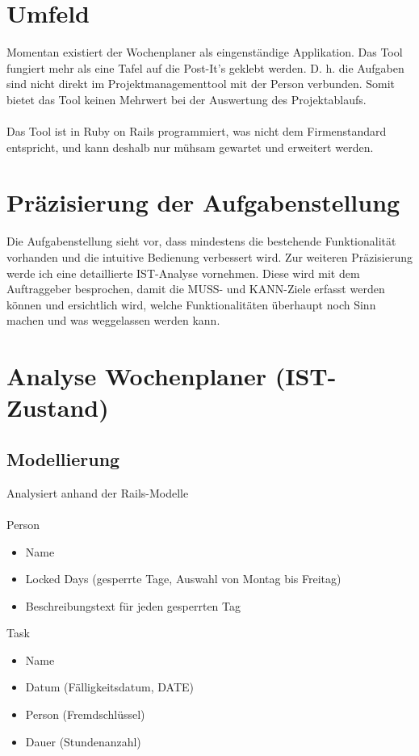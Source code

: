 \section{Umfeld}
Momentan existiert der Wochenplaner als eingenständige Applikation.
Das Tool fungiert mehr als eine Tafel auf die Post-It's geklebt werden. D. h. die Aufgaben sind nicht direkt im Projektmanagementtool mit der Person verbunden.
Somit bietet das Tool keinen Mehrwert bei der Auswertung des Projektablaufs.\\
\\
Das Tool ist in Ruby on Rails programmiert, was nicht dem Firmenstandard entspricht, und kann deshalb nur mühsam gewartet und erweitert werden.

\section{Präzisierung der Aufgabenstellung}
Die Aufgabenstellung sieht vor, dass mindestens die bestehende Funktionalität vorhanden und die intuitive Bedienung verbessert wird. 
Zur weiteren Präzisierung werde ich eine detaillierte IST-Analyse vornehmen. Diese wird mit dem Auftraggeber besprochen, 
damit die MUSS- und KANN-Ziele erfasst werden können und ersichtlich wird, welche Funktionalitäten überhaupt noch Sinn machen und was weggelassen werden kann.

\section{Analyse Wochenplaner (IST-Zustand)}

\subsection{Modellierung}
    Analysiert anhand der Rails-Modelle\\
    \\
    Person
    \begin{itemize}
        \item Name
        \item Locked Days (gesperrte Tage, Auswahl von Montag bis Freitag)
        \item Beschreibungstext für jeden gesperrten Tag
    \end{itemize}
    Task
    \begin{itemize}
        \item Name
        \item Datum (Fälligkeitsdatum, DATE)
        \item Person (Fremdschlüssel)
        \item Dauer (Stundenanzahl)
    \end{itemize}

